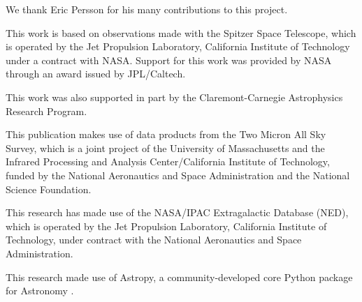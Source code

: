 \documentclass[a4paper,fleqn,usenatbib]{mnras}
\begin{document}
We thank Eric Persson for his many contributions to this project.

This work is based on observations made with the Spitzer Space Telescope, which is operated by the Jet Propulsion Laboratory, California Institute of Technology under a contract with NASA. Support for this work was provided by NASA through an award issued by JPL/Caltech.

This work was also supported in part by the Claremont-Carnegie Astrophysics Research Program.

This publication makes use of data products from the Two Micron All Sky Survey, which is a joint project of the University of Massachusetts and the Infrared Processing and Analysis Center/California Institute of Technology, funded by the National Aeronautics and Space Administration and the National Science Foundation.

This research has made use of the NASA/IPAC Extragalactic Database (NED), which is operated by the Jet Propulsion Laboratory, California Institute of Technology, under contract with the National Aeronautics and Space Administration.

This research made use of Astropy, a community-developed core Python package for Astronomy \citep{2013A&A...558A..33A}.












\clearpage

\newpage

\appendix

\end{document}
